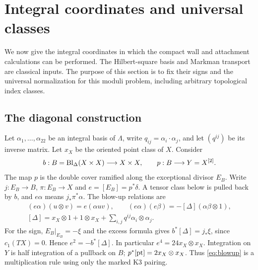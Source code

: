 \section{Integral coordinates and universal classes}\label{sec:ring}

We now give the integral coordinates in which the compact wall and
attachment calculations can be performed. The Hilbert-square basis
and Markman transport are classical inputs. The purpose of this
section is to fix their signs and the universal normalization for
this moduli problem, including arbitrary topological index classes.

\subsection{The diagonal construction}
Let $\alpha_1,\ldots,\alpha_{22}$ be an integral basis of $\Lambda$,
write $q_{ij}=\alpha_i\cdot\alpha_j$, and let $(q^{ij})$ be its
inverse matrix. Let $x_X$ be the oriented point class of $X$.
Consider
\[
 b:B=\operatorname{Bl}_\Delta(X\times X)\longrightarrow X\times X,
 \qquad p:B\longrightarrow Y=X^{[2]}.
\]
The map $p$ is the double cover ramified along the exceptional
divisor $E_B$. Write $j:E_B\to B$, $\pi:E_B\to X$ and
$e=[E_B]=p^*\delta$. A tensor class below is pulled back by $b$,
and $e\alpha$ means $j_*\pi^*\alpha$. The blow-up relations are
\begin{equation}\label{eq:blowup}
 \begin{gathered}
 (e\alpha)(u\otimes v)=e(\alpha uv),\qquad
 (e\alpha)(e\beta)=-[\Delta](\alpha\beta\otimes1),\\
 [\Delta]=x_X\otimes1+1\otimes x_X+
             \sum_{i,j}q^{ij}\alpha_i\otimes\alpha_j.
 \end{gathered}
\end{equation}
For the sign, $E_B|_{E_B}=-\xi$ and the excess formula gives
$b^*[\Delta]=j_*\xi$, since $c_1(TX)=0$. Hence $e^2=-b^*[\Delta]$.
In particular $e^4=24x_X\otimes x_X$. Integration on $Y$ is half
integration of a pullback on $B$; $p^*[\mathrm{pt}]=2x_X\otimes x_X$.
Thus \eqref{eq:blowup} is a multiplication rule using only the
marked K3 pairing.

